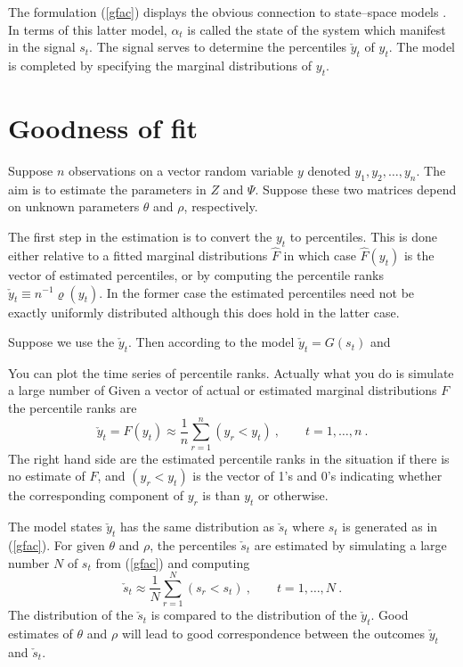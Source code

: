 \documentclass[a4paper,12pt]{article}
\newcommand{\ra}{\varrho}
\newcommand{\eref}[1]{(\ref{#1})}
\begin{document}
The formulation \eref{gfac} displays the obvious connection to state--space models \cite{Harvey:89}.  In terms of this latter model,  $\alpha_t$ is called the state of the system which manifest in the signal $s_t$.  The signal serves to determine the percentiles $\check y_t$ of $y_t$.   The model is completed by specifying the marginal distributions of $y_t$.

\section{Goodness of fit}

Suppose $n$  observations on a vector random variable $y$ denoted $y_1, y_2, \ldots, y_n$. The aim is to estimate the parameters in $Z$ and $\Psi$.   Suppose these two matrices depend on unknown parameters $\theta$ and $\rho$, respectively.

The first step in the estimation is to convert the $y_t$ to percentiles.  This is done either relative to a fitted marginal distributions $\hat F$ in which case $\hat F(y_t)$ is the vector of estimated percentiles, or by computing the percentile ranks 
$
\check y_t \equiv n^{-1}\ra(y_t)
$.
In the former case the estimated percentiles need not be exactly uniformly distributed although this does hold in the latter case.

Suppose we use the $\check y_t$.  Then according to the model $\check y_t=G(s_t)$ and 

You can plot the time series of percentile ranks.  Actually what you do is simulate a large number of 
Given a vector of actual or estimated marginal distributions $F$ the percentile ranks are
$$
\check y_{t} = F(y_t) \approx \frac{1}{n}\sum_{r=1}^n (y_r<y_t)\ ,\qquad t=1,\ldots,n\ .
$$
The right hand side are the estimated percentile ranks in the situation if there is no estimate of $F$, and $(y_r<y_t)$ is the vector of 1's and 0's indicating whether the corresponding component of $y_r$ is  than $y_t$ or otherwise.

The model states $\check y_t$ has the same distribution as $\check s_t$ where $s_t$ is  generated as in \eref{gfac}.  For given $\theta$ and $\rho$, the percentiles $\check s_t$ are estimated by simulating a large number $N$ of $s_t$ from \eref{gfac} and computing
$$
\check s_{t} \approx \frac{1}{N}\sum_{r=1}^N(s_{r}<s_{t})\ , \qquad t=1,\ldots,N\ .
$$
The distribution of the $\check s_t$ is compared to the distribution of the $\check y_t$.   Good estimates of $\theta$ and $\rho$ will lead to good correspondence between the outcomes $\check y_t$ and $\check s_t$.
\end{document}

